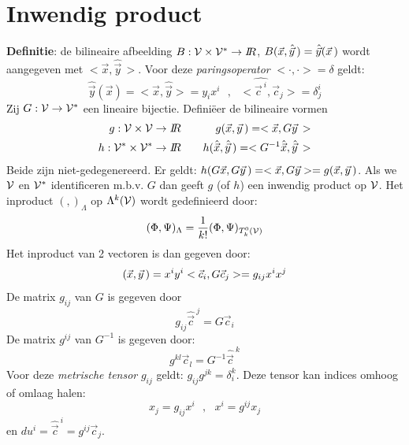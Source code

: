 \documentclass[twoside]{report}
\begin{document}
\section{Inwendig product}
{\bf Definitie}: de bilineaire afbeelding $B:{\cal V}\times{\cal V}^*\rightarrow I\hspace{-1mm}R$,
$B(\vec{x},\hat{\vec{y}}\,)=\hat{\vec{y}}(\vec{x}\,)$ wordt aangegeven met
$<\vec{x},\hat{\vec{y}}\,>$.
Voor deze {\it paringsoperator} $<\cdot,\cdot>=\delta$ geldt:
\[
\hat{\vec{y}}(\vec{x})=<\vec{x},\hat{\vec{y}}>=y_ix^i~~~,~~~<\hat{\vec{c}^{~i}},\vec{c}_j>=\delta_j^i
\]
Zij $G:{\cal V}\rightarrow{\cal V}^*$ een lineaire bijectie. Defini\"eer de
bilineaire vormen
\begin{eqnarray*}
g:{\cal V\times V}\rightarrow I\hspace{-1mm}R&~~~&g(\vec{x},\vec{y}\,)=<\vec{x},G\vec{y}\,>\\
h:{\cal V^*\times V^*}\rightarrow I\hspace{-1mm}R&~~~&h(\hat{\vec{x}},\hat{\vec{y}}\,)=<G^{-1}\hat{\vec{x}},\hat{\vec{y}}\,>
\end{eqnarray*}
Beide zijn niet-gedegenereerd. Er geldt: $h(G\vec{x},G\vec{y}\,)=<\vec{x},G\vec{y}>=g(\vec{x},\vec{y}\,)$.
Als we $\cal V$ en $\cal V^*$ identificeren m.b.v. $G$ dan geeft $g$ (of $h$)
een inwendig product op $\cal V$.
\npar
Het inproduct $(,)_\Lambda$ op $\Lambda^k(\cal V)$ wordt gedefinieerd door:
\[
(\Phi,\Psi)_\Lambda=\frac{1}{k!}(\Phi,\Psi)_{T^0_k(\cal V)}
\]
Het inproduct van 2 vectoren is dan gegeven door:
\[
(\vec{x},\vec{y}\,)=x^iy^i<\vec{c}_i,G\vec{c}_j>=g_{ij}x^ix^j
\]
De matrix $g_{ij}$ van $G$ is gegeven door
\[
g_{ij}\hat{\vec{c}}^{~j}=G\vec{c}_i
\]
De matrix $g^{ij}$ van $G^{-1}$ is gegeven door:
\[
g^{kl}\vec{c}_l=G^{-1}\hat{\vec{c}}^{~k}
\]
Voor deze {\it metrische tensor} $g_{ij}$ geldt: $g_{ij}g^{jk}=\delta_i^k$.
Deze tensor kan indices omhoog of omlaag halen:
\[
x_j=g_{ij}x^i~~~,~~~x^i=g^{ij}x_j
\]
en $du^i=\hat{\vec{c}}^{~i}=g^{ij}\vec{c}_j$.
\npar
\end{document}

